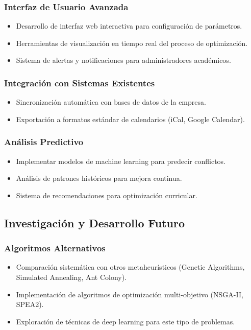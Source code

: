 \subsubsection{Interfaz de Usuario Avanzada}
\begin{itemize}
    \item Desarrollo de interfaz web interactiva para configuración de parámetros.
    \item Herramientas de visualización en tiempo real del proceso de optimización.
    \item Sistema de alertas y notificaciones para administradores académicos.
\end{itemize}

\subsubsection{Integración con Sistemas Existentes}
\begin{itemize}
    \item Sincronización automática con bases de datos de la empresa.
    \item Exportación a formatos estándar de calendarios (iCal, Google Calendar).
\end{itemize}

\subsubsection{Análisis Predictivo}
\begin{itemize}
    \item Implementar modelos de machine learning para predecir conflictos.
    \item Análisis de patrones históricos para mejora continua.
    \item Sistema de recomendaciones para optimización curricular.
\end{itemize}

\subsection{Investigación y Desarrollo Futuro}

\subsubsection{Algoritmos Alternativos}
\begin{itemize}
    \item Comparación sistemática con otros metaheurísticos (Genetic Algorithms, Simulated Annealing, Ant Colony).
    \item Implementación de algoritmos de optimización multi-objetivo (NSGA-II, SPEA2).
    \item Exploración de técnicas de deep learning para este tipo de problemas.
\end{itemize}

